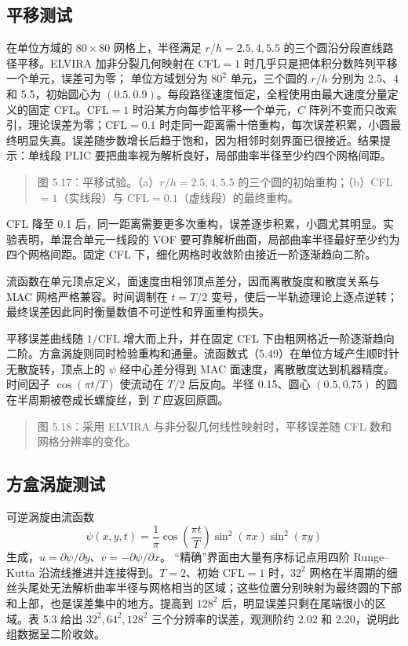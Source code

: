 \documentclass[11pt,a4paper,openany,fontset=none]{ctexbook}
\begin{document}
\subsection{平移测试}

在单位方域的 $80\times80$ 网格上，半径满足 $r/h=2.5,4,5.5$ 的三个圆沿分段直线路径平移。ELVIRA 加非分裂几何映射在 CFL$=1$ 时几乎只是把体积分数阵列平移一个单元，误差可为零；%
单位方域划分为 $80^2$ 单元，三个圆的 $r/h$ 分别为 2.5、4 和 5.5，初始圆心为 $(0.5,0.9)$。每段路径速度恒定，全程使用由最大速度分量定义的固定 CFL。CFL$=1$ 时沿某方向每步恰平移一个单元，$C$ 阵列不变而只改索引，理论误差为零；CFL$=0.1$ 时走同一距离需十倍重构，每次误差积累，小圆最终明显失真。误差随步数增长后趋于饱和，因为相邻时刻界面已很接近。结果提示：单线段 PLIC 要把曲率视为解析良好，局部曲率半径至少约四个网格间距。

\begin{quote}\small 图 5.17：平移试验。（a）$r/h=2.5,4,5.5$ 的三个圆的初始重构；（b）CFL$=1$（实线段）与 CFL$=0.1$（虚线段）的最终重构。\end{quote}
CFL 降至 0.1 后，同一距离需要更多次重构，误差逐步积累，小圆尤其明显。实验表明，单混合单元一线段的 VOF 要可靠解析曲面，局部曲率半径最好至少约为四个网格间距。固定 CFL 下，细化网格时收敛阶由接近一阶逐渐趋向二阶。

流函数在单元顶点定义，面速度由相邻顶点差分，因而离散旋度和散度关系与 MAC 网格严格兼容。时间调制在 $t=T/2$ 变号，使后一半轨迹理论上逐点逆转；最终误差因此同时衡量数值不可逆性和界面重构损失。

平移误差曲线随 $1/\mathrm{CFL}$ 增大而上升，并在固定 CFL 下由粗网格近一阶逐渐趋向二阶。方盒涡旋则同时检验重构和通量。流函数式（5.49）在单位方域产生顺时针无散旋转，顶点上的 $\psi$ 经中心差分得到 MAC 面速度，离散散度达到机器精度。时间因子 $\cos(\pi t/T)$ 使流动在 $T/2$ 后反向。半径 0.15、圆心 $(0.5,0.75)$ 的圆在半周期被卷成长螺旋丝，到 $T$ 应返回原圆。

\begin{quote}\small 图 5.18：采用 ELVIRA 与非分裂几何线性映射时，平移误差随 CFL 数和网格分辨率的变化。\end{quote}
\subsection{方盒涡旋测试}

可逆涡旋由流函数
\begin{equation}
\psi(x,y,t)=\frac1\pi\cos\left(\frac{\pi t}{T}\right)
\sin^2(\pi x)\sin^2(\pi y)
\tag{5.49}
\end{equation}
生成，$u=\partial\psi/\partial y$、$v=-\partial\psi/\partial x$。%
“精确”界面由大量有序标记点用四阶 Runge--Kutta 沿流线推进并连接得到。$T=2$、初始 CFL$=1$ 时，$32^2$ 网格在半周期的细丝头尾处无法解析曲率半径与网格相当的区域；这些位置分别映射为最终圆的下部和上部，也是误差集中的地方。提高到 $128^2$ 后，明显误差只剩在尾端很小的区域。表 5.3 给出 $32^2,64^2,128^2$ 三个分辨率的误差，观测阶约 2.02 和 2.20，说明此组数据呈二阶收敛。
\end{document}
